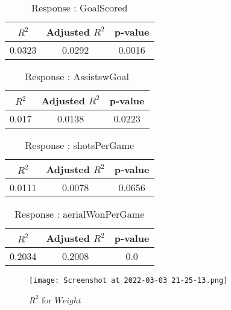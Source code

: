 \documentclass[12pt]{article}
\begin{document}
\begin{minipage}{0.5\textwidth}
	\begin{table}[H]
	\centering
	\caption{Response : GoalScored}\label{table:1a}
	{\begin{tabular}{|c|c|c|}
			\hline
			$ R^2 $ & Adjusted $ R^2 $ & p-value \\
			\hline
			0.0323 & 0.0292 & 0.0016 \\
			\hline
		\end{tabular}
	}
\end{table}
\begin{table}[H]
	\centering
	\caption{Response : AssistswGoal}\label{table:1a}
	{\begin{tabular}{|c|c|c|}
			\hline
			$ R^2 $ & Adjusted $ R^2 $ & p-value \\
			\hline
			0.017 & 0.0138 & 0.0223 \\
			\hline
		\end{tabular}
	}
\end{table}
\end{minipage}
\hfill
\begin{minipage}{0.5\textwidth}
	\begin{table}[H]
	\centering
	\caption{Response : shotsPerGame }\label{table:1a}
	{\begin{tabular}{|c|c|c|}
			\hline
			$ R^2 $ & Adjusted $ R^2 $ & p-value \\
			\hline
			0.0111 & 0.0078 & 0.0656 \\
			\hline
		\end{tabular}
	}
\end{table}
	\begin{table}[H]
	\centering
	\caption{Response : aerialWonPerGame}\label{table:1a}
	{\begin{tabular}{|c|c|c|}
			\hline
			$ R^2 $ & Adjusted $ R^2 $ & p-value \\
			\hline
			0.2034 & 0.2008 & 0.0 \\
			\hline
		\end{tabular}
	}
\end{table}
\end{minipage}


\begin{figure}[H]
	\centering
	\texttt{[image: Screenshot at 2022-03-03 21-25-13.png]}
	\caption{$ R^2 $ for $ Weight $}
	\label{fig:1}
\end{figure}
\end{document}
